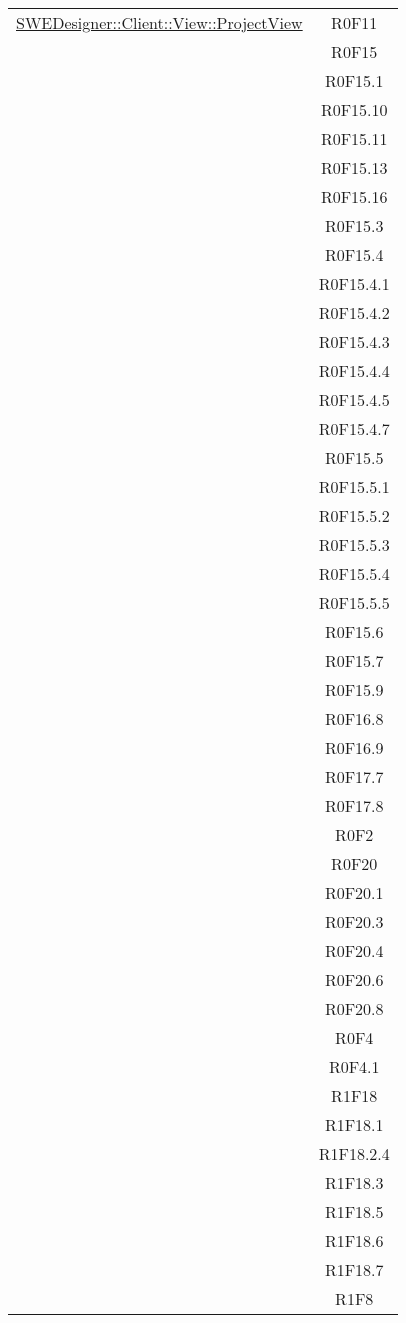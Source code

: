 \documentclass[../DefinizioneDiProdotto.tex]{subfiles}
\begin{document}
\begin{longtable}{|c|c|}
				\hyperlink{SWEDesigner::Client::View::ProjectView}{SWEDesigner::Client::View::ProjectView}
				& R0F11\\
				& R0F15\\
				& R0F15.1\\
				& R0F15.10\\
				& R0F15.11\\
				& R0F15.13\\
				& R0F15.16\\
				& R0F15.3\\
				& R0F15.4\\
				& R0F15.4.1\\
				& R0F15.4.2\\
				& R0F15.4.3\\
				& R0F15.4.4\\
				& R0F15.4.5\\
				& R0F15.4.7\\
				& R0F15.5\\
				& R0F15.5.1\\
				& R0F15.5.2\\
				& R0F15.5.3\\
				& R0F15.5.4\\
				& R0F15.5.5\\
				& R0F15.6\\
				& R0F15.7\\
				& R0F15.9\\
				& R0F16.8\\
				& R0F16.9\\
				& R0F17.7\\
				& R0F17.8\\
				& R0F2\\
				& R0F20\\
				& R0F20.1\\
				& R0F20.3\\
				& R0F20.4\\
				& R0F20.6\\
				& R0F20.8\\
				& R0F4\\
				& R0F4.1\\
				& R1F18\\
				& R1F18.1\\
				& R1F18.2.4\\
				& R1F18.3\\
				& R1F18.5\\
				& R1F18.6\\
				& R1F18.7\\
				& R1F8\\
				\hline


\end{longtable}
\end{document}
